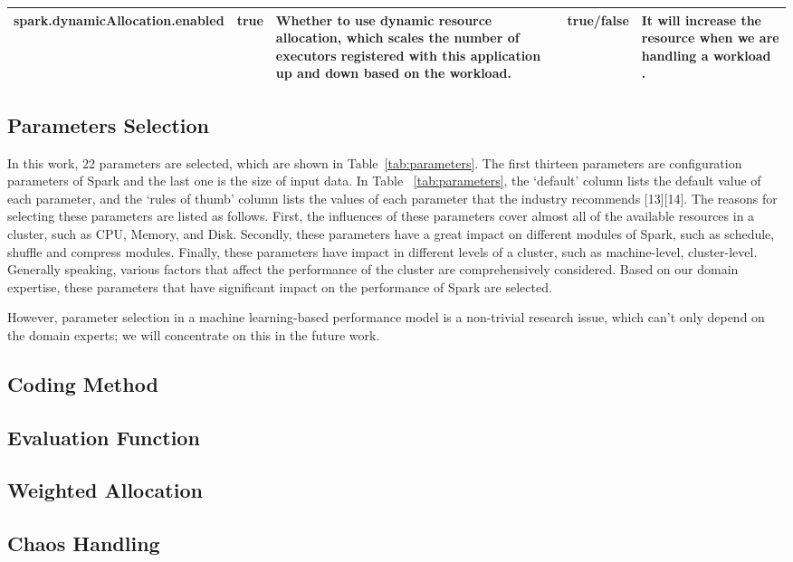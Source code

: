 \begin{table*}[t]
\begin{center}
\begin{tabular}{ | c | c  | p{5cm} | c | p{5cm} |}
  \hline
     spark.dynamicAllocation.enabled &  true & Whether to use dynamic resource allocation, which scales the number of executors registered with this application up and down based on the workload. & true/false & It will increase the resource when we are handling a workload .\\
   \hline    
    \end{tabular}
\end{center}	
\end{table*}

\subsection{Parameters Selection}
\par In this work, 22 parameters are selected, which are shown in Table~\ref{tab:parameters}. The first thirteen parameters are configuration parameters of Spark and the last one is the size of input data. In Table ~\ref{tab:parameters}, the ‘default’ column lists the default value of each parameter, and the ‘rules of thumb’ column lists the values of each parameter that the industry recommends [13][14]. The reasons for selecting these parameters are listed as follows. First, the influences of these parameters cover almost all of the available resources in a cluster, such as CPU, Memory, and Disk. Secondly, these parameters have a great impact on different modules of Spark, such as schedule, shuffle and compress modules. Finally, these parameters have impact in different levels of a cluster, such as machine-level, cluster-level. Generally speaking, various factors that affect the performance of the cluster are comprehensively considered. Based on our domain expertise, these parameters that have significant impact on the performance of Spark are selected.

\par However, parameter selection in a machine learning-based performance model is a non-trivial research issue, which can’t only depend on the domain experts; we will concentrate on this in the future work.

\subsection{Coding Method}

\subsection{Evaluation Function}
\subsection{Weighted Allocation}
\subsection{Chaos Handling}





